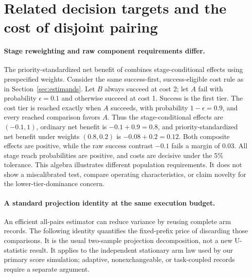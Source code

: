 \section{Related decision targets and the cost of disjoint pairing}
\label{app:pairing_efficiency}

\paragraph{Stage reweighting and raw component requirements differ.}
The priority-standardized net benefit of \citet{mccoy2026psnb} combines
stage-conditional effects using prespecified weights. Consider the same
success-first, success-eligible cost rule as in Section~\ref{sec:estimands}.
Let $B$ always succeed at cost 2; let $A$ fail with probability
$\epsilon=0.1$ and otherwise succeed at cost 1. Success is the first
tier. The cost tier is reached exactly when $A$ succeeds, with
probability $1-\epsilon=0.9$, and every reached comparison favors $A$.
Thus the stage-conditional effects are $(-0.1,1)$, ordinary net benefit
is $-0.1+0.9=0.8$, and priority-standardized net benefit under weights
$(0.8,0.2)$ is $-0.08+0.2=0.12$. Both composite effects are positive,
while the raw success contrast $-0.1$ fails a margin of $0.03$.
All stage reach probabilities are positive, and costs are decisive under
the 5\% tolerance. This algebra illustrates different population
requirements. It does not show a miscalibrated test, compare operating
characteristics, or claim novelty for the lower-tier-dominance concern.

\paragraph{A standard projection identity at the same execution budget.}
An efficient all-pairs estimator can reduce variance by reusing complete
arm records. The following identity quantifies the fixed-prefix price of
discarding those comparisons. It is the usual two-sample projection
decomposition, not a new U-statistic result. It applies to the independent
stationary arm law used by our primary score simulation; adaptive,
nonexchangeable, or task-coupled records require a separate argument.

